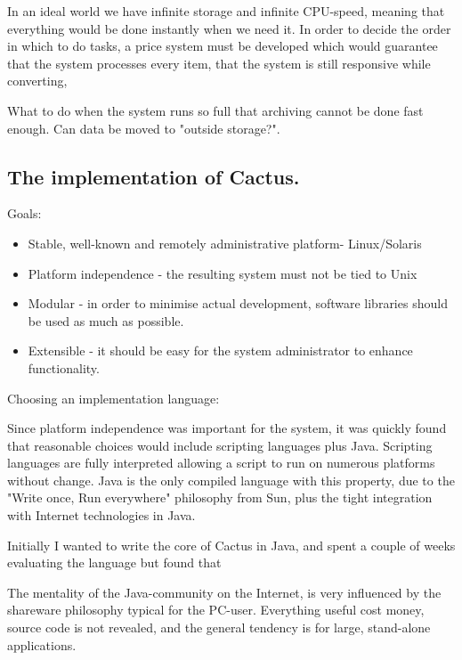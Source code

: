 In an ideal world we have infinite storage and infinite CPU-speed,
meaning that everything would be done instantly when we need it.  In
order to decide the order in which to do tasks, a price system must be
developed which would guarantee that the system processes every item,
that the system is still responsive while converting,

\textsf{
What to do when the system runs so full that archiving cannot be done
fast enough.  Can data be moved to "outside storage?".
}


\subsection{The implementation of Cactus.}



Goals:

\begin{itemize}
\item Stable, well-known and remotely administrative platform-
  Linux/Solaris
\item Platform independence - the resulting system must not be tied to
  Unix
 
\item Modular - in order to minimise actual development, software
  libraries should be used as much as possible.
  
\item Extensible - it should be easy for the system administrator to
  enhance functionality.
\end{itemize}

Choosing an implementation language:
\label{sec:cactus-choice-of-language}

Since platform independence was important for the system, it was
quickly found that reasonable choices would include scripting
languages plus Java.  Scripting languages are fully interpreted
allowing a script to run on numerous platforms without change.  Java
is the only compiled language with this property, due to the "Write
once, Run everywhere" philosophy from Sun, plus the tight integration
with Internet technologies in Java.

Initially I wanted to write the core of Cactus in Java, and spent a
couple of weeks evaluating the language but found that


  The mentality of the Java-community on the Internet, is very influenced by the shareware philosophy typical for the PC-user.   Everything useful cost money, source
code is not revealed, and the general tendency is for large, stand-alone applications.

